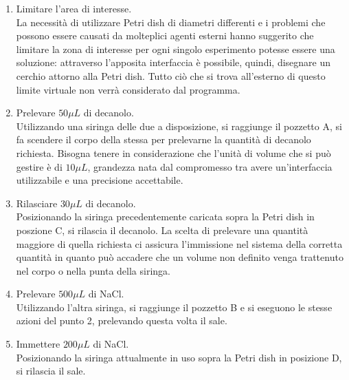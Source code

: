 \begin{enumerate}

	\item Limitare l'area di interesse.\\
		La necessità di utilizzare Petri dish di diametri differenti e i problemi che possono essere causati da molteplici agenti esterni hanno suggerito che limitare la zona di interesse per ogni singolo esperimento potesse essere una soluzione: attraverso l'apposita interfaccia è possibile, quindi, disegnare un cerchio attorno alla Petri dish. Tutto ciò che si trova all'esterno di questo limite virtuale non verrà considerato dal programma.

	\item Prelevare $50\mu L$ di decanolo.\\
		Utilizzando una siringa delle due a disposizione, si raggiunge il pozzetto A, si fa scendere il corpo della stessa per prelevarne la quantità di decanolo richiesta. Bisogna tenere in considerazione che l'unità di volume che si può gestire è di $10\mu L$, grandezza nata dal compromesso tra avere un'interfaccia utilizzabile e una precisione accettabile. 

	\item Rilasciare $30\mu L$ di decanolo.\\
		 Posizionando la siringa precedentemente caricata sopra la Petri dish in poszione C, si rilascia il decanolo. 
La scelta di prelevare una quantità maggiore di quella richiesta ci assicura l'immissione nel sistema della corretta quantità in quanto può accadere che un volume non definito venga trattenuto nel corpo o nella punta della siringa.

	\item  Prelevare $500\mu L$ di NaCl. \\
		Utilizzando l'altra siringa, si raggiunge il pozzetto B e si eseguono le stesse azioni del punto 2, prelevando questa volta il sale. 
	
	\item Immettere $200\mu L$ di NaCl.\\
		Posizionando la siringa attualmente in uso sopra la Petri dish in posizione D, si rilascia il sale. 
\end{enumerate}

